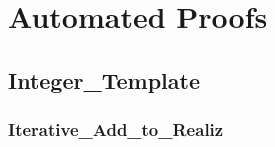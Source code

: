 

\section{Automated Proofs\label{apx:proofs}}

	\subsection{Integer\_Template}	%

		\subsubsection{Iterative\_Add\_to\_Realiz}	%

